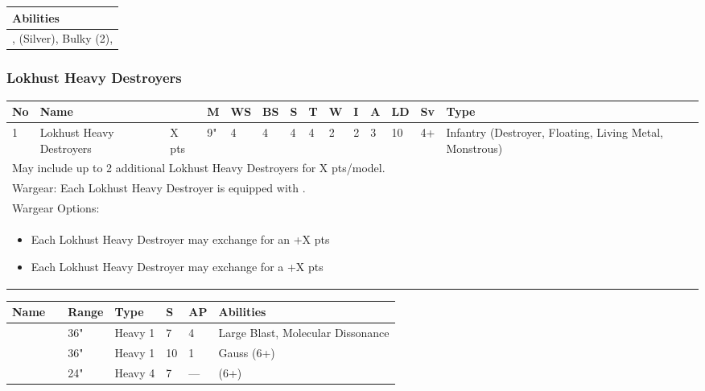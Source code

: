 \noindent
\begin{tabular}{||m{532pt}||}
	\hline
	Abilities \\
	\hline
	\quickref{Annihilation Protocols}, \quickref{Awakening Protocols} (Silver), Bulky (2), \quickref{Reanimation Protocols} \\
	\hline
\end{tabular}


\newpage
\subsubsection{Lokhust Heavy Destroyers}

\noindent
\begin{tabular}{||m{10pt} m{90pt} m{30pt} m{11pt} m{11pt} m{11pt} m{11pt} m{11pt} m{11pt} m{11pt} m{11pt} m{11pt} m{11pt} m{135pt}||}
	\hline
	No & Name & & M & WS & BS & S & T & W & I & A & LD & Sv & Type \\
	\hline
	1 & Lokhust Heavy Destroyers & X pts & 9" & 4 & 4 & 4 & 4 & 2 & 2 & 3 & 10 & 4+ & Infantry (Destroyer, Floating, Living Metal, Monstrous) \\
	\hline
	\hline
	\multicolumn{14}{||Z{532 pt}||}{May include up to 2 additional Lokhust Heavy Destroyers for X pts/model.}\\	
	\hline
	\hline
	\multicolumn{14}{||Z{532 pt}||}{Wargear: Each Lokhust Heavy Destroyer is equipped with \quickref{Gauss Destructor}.} \\
	\multicolumn{14}{||Z{532 pt}||}{Wargear Options:} \\	\multicolumn{14}{||Z{532 pt}||}{\begin{itemize}
			\item Each Lokhust Heavy Destroyer may exchange \quickref{Gauss Destructor} for an \quickref{Enmitic Exterminator} \hrulefill +X pts
			\item Each Lokhust Heavy Destroyer may exchange \quickref{Gauss Destructor} for a \quickref{Tesla Destructor} \hrulefill +X pts
	\end{itemize}} \\
	\hline
\end{tabular}

\noindent
\begin{tabular}{||m{110pt} m{30pt} m{31pt} m{55pt} m{12pt} m{12pt} m{210pt}||}
	\hline
	Name & & Range & Type & S & AP & Abilities \\
	\hline
	\quickref{Enmitic Exterminator} &  & 36" & Heavy 1 & 7 & 4 & Large Blast, Molecular Dissonance \\
	\quickref{Gauss Destructor} &  & 36" & Heavy 1 & 10 & 1 &  Gauss (6+) \\
	\quickref{Tesla Destructor} &  & 24" & Heavy 4 & 7 & — &  \quickref{Tesla} (6+) \\
	\hline
\end{tabular}

